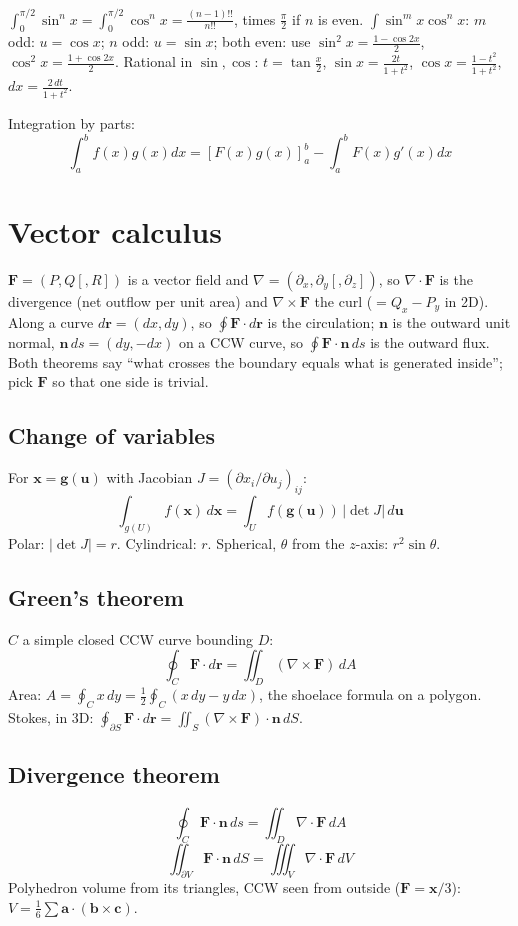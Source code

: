 $\int_0^{\pi/2}\sin^n x = \int_0^{\pi/2}\cos^n x = \frac{(n-1)!!}{n!!}$, times $\frac\pi2$ if $n$ is even.
$\int\sin^m x\cos^n x$: $m$ odd: $u=\cos x$; $n$ odd: $u=\sin x$; both even: use $\sin^2 x=\frac{1-\cos 2x}2$, $\cos^2 x=\frac{1+\cos 2x}2$.
Rational in $\sin,\cos$: $t=\tan\frac x2$, $\sin x=\frac{2t}{1+t^2}$, $\cos x=\frac{1-t^2}{1+t^2}$, $dx=\frac{2\,dt}{1+t^2}$.

Integration by parts:
\[\int_a^bf(x)g(x)dx = [F(x)g(x)]_a^b-\int_a^bF(x)g'(x)dx\]

\section{Vector calculus}
$\mathbf{F} = (P, Q[, R])$ is a vector field and $\nabla = (\partial_x, \partial_y[, \partial_z])$, so $\nabla\cdot\mathbf{F}$ is the divergence (net outflow per unit area) and $\nabla\times\mathbf{F}$ the curl ($= Q_x - P_y$ in 2D). Along a curve $d\mathbf{r} = (dx, dy)$, so $\oint \mathbf{F}\cdot d\mathbf{r}$ is the circulation; $\mathbf{n}$ is the outward unit normal, $\mathbf{n}\,ds = (dy, -dx)$ on a CCW curve, so $\oint \mathbf{F}\cdot\mathbf{n}\,ds$ is the outward flux. Both theorems say ``what crosses the boundary equals what is generated inside''; pick $\mathbf{F}$ so that one side is trivial.

\subsection{Change of variables}
For $\mathbf{x} = \mathbf{g}(\mathbf{u})$ with Jacobian $J = (\partial x_i / \partial u_j)_{ij}$:
\[ \int_{g(U)} f(\mathbf{x})\,d\mathbf{x} = \int_U f(\mathbf{g}(\mathbf{u}))\,|\det J|\,d\mathbf{u} \]
Polar: $|\det J| = r$. Cylindrical: $r$. Spherical, $\theta$ from the $z$-axis: $r^2\sin\theta$.

\subsection{Green's theorem}
$C$ a simple closed CCW curve bounding $D$:
\[ \oint_C \mathbf{F}\cdot d\mathbf{r} = \iint_D (\nabla\times\mathbf{F})\,dA \]
Area: $A = \oint_C x\,dy = \frac12\oint_C (x\,dy - y\,dx)$, the shoelace formula on a polygon. Stokes, in 3D: $\oint_{\partial S} \mathbf{F}\cdot d\mathbf{r} = \iint_S (\nabla\times\mathbf{F})\cdot\mathbf{n}\,dS$.

\subsection{Divergence theorem}
\[ \oint_C \mathbf{F}\cdot\mathbf{n}\,ds = \iint_D \nabla\cdot\mathbf{F}\,dA \]
\[ \iint_{\partial V} \mathbf{F}\cdot\mathbf{n}\,dS = \iiint_V \nabla\cdot\mathbf{F}\,dV \]
Polyhedron volume from its triangles, CCW seen from outside ($\mathbf{F} = \mathbf{x}/3$): $V = \frac16\sum \mathbf{a}\cdot(\mathbf{b}\times\mathbf{c})$.


